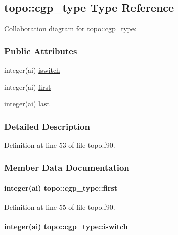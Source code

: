 \hypertarget{structtopo_1_1cgp__type}{\subsection{topo\-:\-:cgp\-\_\-type Type Reference}
\label{structtopo_1_1cgp__type}
}


Collaboration diagram for topo\-:\-:cgp\-\_\-type\-:
\subsubsection*{Public Attributes}
\begin{DoxyCompactItemize}
\item 
integer(ai) \hyperlink{structtopo_1_1cgp__type_a0bf0bb22779f4b609fa2451111ed63b8}{iswitch}
\item 
integer(ai) \hyperlink{structtopo_1_1cgp__type_a5fb8c62e74772b72b6894b1894a0ced0}{first}
\item 
integer(ai) \hyperlink{structtopo_1_1cgp__type_a6564b85aef9ef0679cf1a78e7df26975}{last}
\end{DoxyCompactItemize}


\subsubsection{Detailed Description}


Definition at line 53 of file topo.\-f90.



\subsubsection{Member Data Documentation}
\hypertarget{structtopo_1_1cgp__type_a5fb8c62e74772b72b6894b1894a0ced0}{
\paragraph[{first}]{\setlength{\rightskip}{0pt plus 5cm}integer(ai) topo\-::cgp\-\_\-type\-::first}}\label{structtopo_1_1cgp__type_a5fb8c62e74772b72b6894b1894a0ced0}


Definition at line 55 of file topo.\-f90.

\hypertarget{structtopo_1_1cgp__type_a0bf0bb22779f4b609fa2451111ed63b8}{
\paragraph[{iswitch}]{\setlength{\rightskip}{0pt plus 5cm}integer(ai) topo\-::cgp\-\_\-type\-::iswitch}}\label{structtopo_1_1cgp__type_a0bf0bb22779f4b609fa2451111ed63b8}


